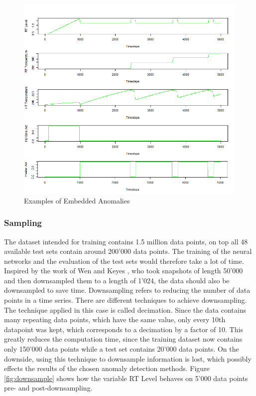 \begin{figure}[h]
	\centering
	\includegraphics[scale=0.6]{Figures/GHL_data}
	\decoRule
	\caption[Most important var]{Examples of Embedded Anomalies \parencite{Own}}
	\label{fig:GHL_data}
\end{figure}

\subsubsection{Sampling}
The dataset intended for training contains 1.5 million data points, on top all 48 available test sets contain around 200'000 data points. The training of the neural networks and the evaluation of the test sets would therefore take a lot of time. Inspired by the work of Wen and Keyes \parencite*{Wen2019}, who took snapshots of length 50'000 and then downsampled them to a length of 1'024, the data should also be downsampled to save time. Downsampling  refers to reducing the number of data points in a time series. There are different techniques to achieve downsampling. The technique applied in this case is called decimation. Since the data contains many repeating data points, which have the same value, only every 10th datapoint was kept, which corresponds to a decimation by a factor of 10. This greatly reduces the computation time, since the training dataset now contains only 150'000 data points while a test set contains 20'000 data points. On the downside, using this technique to downsample information is lost, which possibly effects the results of the chosen anomaly detection methods. Figure \ref{fig:downsample} shows how the variable RT Level behaves on 5'000 data points pre- and post-downsampling.

